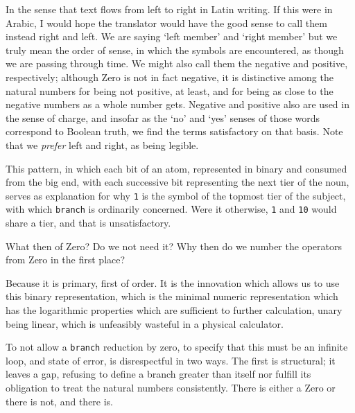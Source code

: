 \documentclass[twoside]{article}
\begin{document}
In the sense that text flows from left to right in Latin writing. If this were in Arabic, I would hope the translator would have the good sense to call them instead right and left. We are saying `left member' and `right member' but we truly mean the order of sense, in which the symbols are encountered, as though we are passing through time. We might also call them the negative and positive, respectively; although Zero is not in fact negative, it is distinctive among the natural numbers for being not positive, at least, and for being as close to the negative numbers as a whole number gets. Negative and positive also are used in the sense of charge, and insofar as the `no' and `yes' senses of those words correspond to Boolean truth, we find the terms satisfactory on that basis.
Note that we \emph{prefer} left and right, as being legible.

This pattern, in which each bit of an atom, represented in binary and consumed from the big end, with each successive bit representing the next tier of the noun, serves as explanation for why \texttt{1} is the symbol of the topmost tier of the subject, with which \texttt{branch} is ordinarily concerned. Were it otherwise, \texttt{1} and \texttt{10} would share a tier, and that is unsatisfactory.

What then of Zero? Do we not need it? Why then do we number the operators from Zero in the first place?

Because it is primary, first of order. It is the innovation which allows us to use this binary representation, which is the minimal numeric representation which has the logarithmic properties which are sufficient to further calculation, unary being linear, which is unfeasibly wasteful in a physical calculator.

To not allow a \texttt{branch} reduction by zero, to specify that this must be an infinite loop, and state of error, is disrespectful in two ways. The first is structural; it leaves a gap, refusing to define a branch greater than itself nor fulfill its obligation to treat the natural numbers consistently. There is either a Zero or there is not, and there is.
\end{document}
